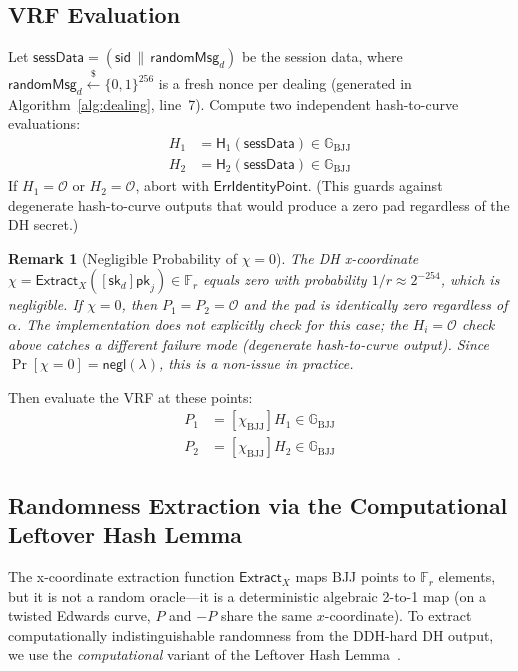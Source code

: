 \documentclass[11pt,a4paper]{article}
\newtheorem{remark}{Remark}[section]
\newcommand{\F}{\mathbb{F}}
\newcommand{\G}{\mathbb{G}}
\newcommand{\Gbj}{\G_{\mathrm{BJJ}}}
\newcommand{\Fr}{\F_r}
\newcommand{\sk}{\mathsf{sk}}
\newcommand{\pk}{\mathsf{pk}}
\newcommand{\sid}{\mathsf{sid}}
\newcommand{\hashcurve}{\mathsf{H}}
\newcommand{\Extract}{\mathsf{Extract}_X}
\newcommand{\dhx}{\chi}
\newcommand{\negl}{\mathsf{negl}}
\newcommand{\getsr}{\xleftarrow{\$}}
\begin{document}
\subsection{VRF Evaluation}
\label{sec:vrfeval}

Let $\mathsf{sessData} = (\sid \,\|\, \mathsf{randomMsg}_d)$ be the session
data, where $\mathsf{randomMsg}_d \getsr \{0,1\}^{256}$ is a fresh nonce per
dealing (generated in Algorithm~\ref{alg:dealing}, line~7). Compute two
independent hash-to-curve evaluations:
\begin{align}
  H_1 &= \hashcurve_1(\mathsf{sessData}) \in \Gbj  \label{eq:h1} \\
  H_2 &= \hashcurve_2(\mathsf{sessData}) \in \Gbj  \label{eq:h2}
\end{align}
If $H_1 = \mathcal{O}$ or $H_2 = \mathcal{O}$, abort with
$\mathsf{ErrIdentityPoint}$. (This guards against degenerate hash-to-curve
outputs that would produce a zero pad regardless of the DH secret.)

\begin{remark}[Negligible Probability of $\dhx = 0$]
  \label{rem:chi-zero}
  The DH x-coordinate $\dhx = \Extract([\sk_d]\pk_j) \in \Fr$ equals zero with
  probability $1/r \approx 2^{-254}$, which is negligible. If $\dhx = 0$, then
  $P_1 = P_2 = \mathcal{O}$ and the pad is identically zero regardless of
  $\alpha$. The implementation does not explicitly check for this case; the
  $H_i = \mathcal{O}$ check above catches a different failure mode (degenerate
  hash-to-curve output). Since $\Pr[\dhx = 0] = \negl(\lambda)$, this is a
  non-issue in practice.
\end{remark}

Then evaluate the VRF at these points:
\begin{align}
  P_1 &= [\dhx_{\mathrm{BJJ}}] H_1 \in \Gbj  \label{eq:p1} \\
  P_2 &= [\dhx_{\mathrm{BJJ}}] H_2 \in \Gbj  \label{eq:p2}
\end{align}

\subsection{Randomness Extraction via the Computational Leftover Hash Lemma}
\label{sec:lhl}

The x-coordinate extraction function $\Extract$ maps BJJ points to $\Fr$ elements,
but it is not a random oracle---it is a deterministic algebraic 2-to-1 map
(on a twisted Edwards curve, $P$ and $-P$ share the same $x$-coordinate).
To extract computationally indistinguishable randomness from the DDH-hard
DH output, we use the \emph{computational} variant of the Leftover Hash
Lemma~\cite{dodis2008}.
\end{document}
